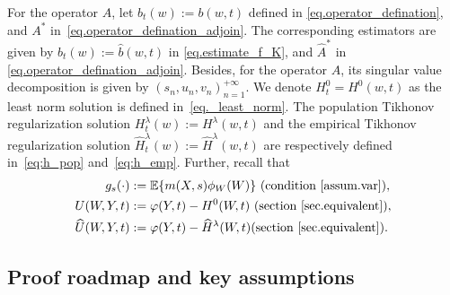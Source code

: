\documentclass[
  12pt]{article}
\def\wh{\widehat}
\begin{document}
For the operator $A$, let $b_t(w):=b(w,t)$ defined in \eqref{eq.operator_defination}, and $A^*$ in~\eqref{eq.operator_defination_adjoin}. The corresponding estimators are given by $\wh{b}_t(w):=\wh{b}(w,t)$ in \eqref{eq.estimate_f_K}, and $\wh{A}^*$ in \eqref{eq.operator_defination_adjoin}. Besides, for the operator $A$, its singular value decomposition is given by $(s_n,u_n,v_n)_{n=1}^{+\infty}$. We denote $H^0_t=H^0(w,t)$ as the least norm solution is defined in~\eqref{eq._least_norm}. The population Tikhonov regularization solution $H^{\lambda}_t(w):=H^{\lambda}(w,t)$ and the empirical Tikhonov regularization solution $\wh{H}^{\lambda}_t(w):=\wh{H}^{\lambda}(w,t)$ are respectively defined in~\eqref{eq:h_pop} and~\eqref{eq:h_emp}. Further, recall that 
\begin{align}
    g_s(\cdot) & := \mathbb{E} \{ m(X,s)\phi_W(W)\} \ (\text{condition~\ref{assum.var}}), \label{eq.gs} \\
    U(W,Y,t) & :=\varphi(Y,t)-H^0(W,t) 
    \ (\text{section~\ref{sec.equivalent}}), \label{eq.U} \\
    \wh{U}(W,Y,t) & := \varphi(Y,t)-\wh{H}^{\lambda}(W,t)  (\text{section~\ref{sec.equivalent}}).
    \label{eq.U-hat}
\end{align}




\subsection{Proof roadmap and key assumptions}
\label{sec.poof_roadmap}
\end{document}
